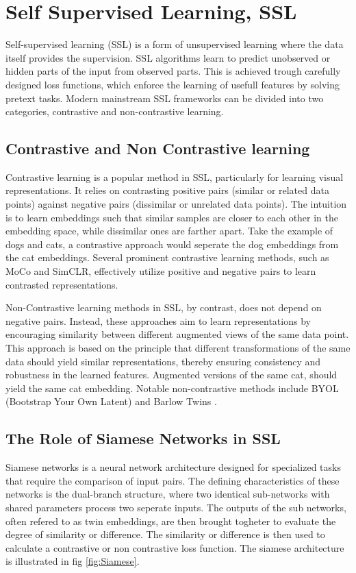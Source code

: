 \section{Self Supervised Learning, SSL}
Self-supervised learning (SSL) is a form of unsupervised learning where the data itself provides the supervision. SSL algorithms learn to predict unobserved or hidden parts of the input from observed parts.
This is achieved trough carefully designed loss functions, which enforce the learning of usefull features by solving pretext tasks. Modern mainstream SSL frameworks can be divided into two categories, contrastive and non-contrastive learning.

\subsection{Contrastive and Non Contrastive learning}
Contrastive learning is a popular method in SSL, particularly for learning visual representations. It relies on contrasting positive pairs (similar or related data points) against negative pairs (dissimilar or unrelated data points). 
The intuition is to learn embeddings such that similar samples are closer to each other in the embedding space, while dissimilar ones are farther apart. Take the example of dogs and cats,
a contrastive approach would seperate the dog embeddings from the cat embeddings. Several prominent contrastive learning methods, such as MoCo\cite{MoCo} and SimCLR\cite{SimCLR}, effectively utilize positive and negative pairs to learn contrasted representations.

Non-Contrastive learning methods in SSL, by contrast, does not depend on negative pairs. Instead, these approaches aim to learn representations by encouraging similarity between different augmented views of the same data point. 
This approach is based on the principle that different transformations of the same data should yield similar representations, thereby ensuring consistency and robustness in the learned features.
Augmented versions of the same cat, should yield the same cat embedding. Notable non-contrastive methods include BYOL (Bootstrap Your Own Latent)\cite{BYOL} and Barlow Twins \cite{Barlow}.

\subsection{The Role of Siamese Networks in SSL}
Siamese networks\cite{Siamese} is a neural network architecture designed for specialized tasks that require the comparison of input pairs. The defining characteristics of these networks is the dual-branch structure, where two identical sub-networks with shared parameters process two seperate inputs.
The outputs of the sub networks, often refered to as twin embeddings, are then brought togheter to evaluate the degree of similarity or difference. The similarity or difference is then used to calculate a contrastive or non contrastive loss function.
The siamese architecture is illustrated in fig \ref{fig:Siamese}. 

